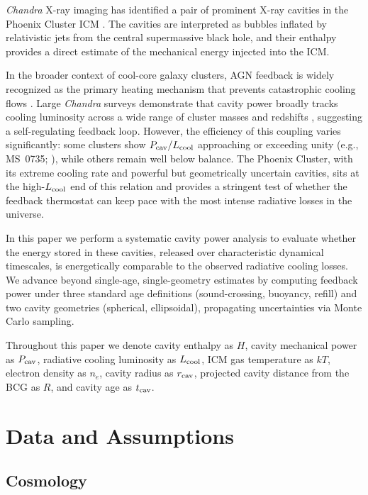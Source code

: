 \documentclass[twocolumn]{aastex63}
\newcommand{\Lcool}{L_{\rm cool}}
\newcommand{\Pcav}{P_{\rm cav}}
\newcommand{\tcav}{t_{\rm cav}}
\newcommand{\rcav}{r_{\rm cav}}
\begin{document}
\textit{Chandra} X-ray imaging has identified a pair of prominent X-ray cavities
in the Phoenix Cluster ICM \citep{McDonald2015, Hlavacek-Larrondo2015}. The
cavities are interpreted as bubbles inflated by relativistic jets from the central
supermassive black hole, and their enthalpy provides a direct estimate of the
mechanical energy injected into the ICM.

In the broader context of cool-core galaxy clusters, AGN feedback is widely
recognized as the primary heating mechanism that prevents catastrophic cooling
flows \citep{McNamara2007}. Large \textit{Chandra} surveys demonstrate that
cavity power broadly tracks cooling luminosity across a wide range of cluster
masses and redshifts \citep{Rafferty2006, DunnFabian2006}, suggesting a
self-regulating feedback loop. However, the efficiency of this coupling varies
significantly: some clusters show $\Pcav/\Lcool$ approaching or exceeding unity
(e.g., MS~0735; \citealt{McNamara2005}), while others remain well below balance.
The Phoenix Cluster, with its extreme cooling rate and powerful but
geometrically uncertain cavities, sits at the high-$\Lcool$ end of this relation
and provides a stringent test of whether the feedback thermostat can keep pace
with the most intense radiative losses in the universe.

In this paper we perform a systematic cavity power analysis to evaluate whether
the energy stored in these cavities, released over characteristic dynamical
timescales, is energetically comparable to the observed radiative cooling losses.
We advance beyond single-age, single-geometry estimates by computing feedback
power under three standard age definitions (sound-crossing, buoyancy, refill) and
two cavity geometries (spherical, ellipsoidal), propagating uncertainties via
Monte Carlo sampling.

Throughout this paper we denote cavity enthalpy as $H$, cavity mechanical
power as $\Pcav$, radiative cooling luminosity as $\Lcool$, ICM gas
temperature as $kT$, electron density as $n_e$, cavity radius as $\rcav$,
projected cavity distance from the BCG as $R$, and cavity age as $\tcav$.

\section{Data and Assumptions}
\label{sec:data}

\subsection{Cosmology}
\end{document}
